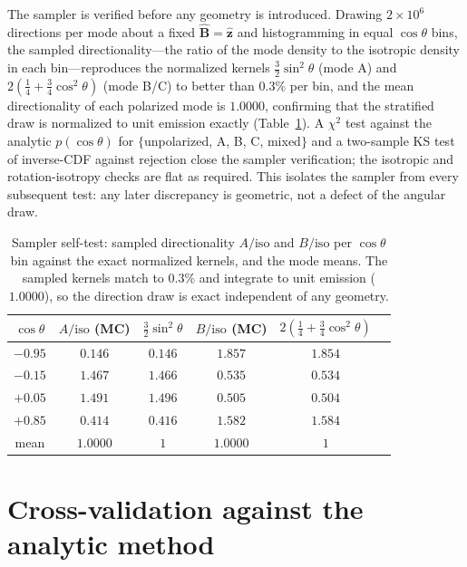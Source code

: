 \documentclass[11pt]{article}
\newcommand{\Bhat}{\hat{\bm{B}}}
\newcommand{\iso}{\mathrm{iso}}
\begin{document}
The sampler is verified before any geometry is introduced. Drawing $2\times10^6$
directions per mode about a fixed $\Bhat=\hat{\bm z}$ and histogramming in equal
$\cos\theta$ bins, the sampled directionality---the ratio of the mode density to the
isotropic density in each bin---reproduces the normalized kernels
$\tfrac32\sin^2\theta$ (mode A) and $2(\tfrac14+\tfrac34\cos^2\theta)$ (mode B/C) to
better than $0.3\%$ per bin, and the mean directionality of each polarized mode is
$1.0000$, confirming that the stratified draw is normalized to unit emission exactly
(Table~\ref{tab:sampler}). A $\chi^2$ test against the analytic $p(\cos\theta)$ for
$\{$unpolarized, A, B, C, mixed$\}$ and a two-sample KS test of inverse-CDF against
rejection close the sampler verification; the isotropic and rotation-isotropy checks are
flat as required. This isolates the sampler from every subsequent test: any later
discrepancy is geometric, not a defect of the angular draw.

\begin{table}[t]
\centering
\caption{Sampler self-test: sampled directionality $A/\iso$ and $B/\iso$ per
$\cos\theta$ bin against the exact normalized kernels, and the mode means. The sampled
kernels match to $0.3\%$ and integrate to unit emission ($1.0000$), so the direction draw
is exact independent of any geometry.}
\label{tab:sampler}
\begin{tabular}{cccccc}
\toprule
$\cos\theta$ & $A/\iso$ (MC) & $\tfrac32\sin^2\theta$ & $B/\iso$ (MC) & $2(\tfrac14+\tfrac34\cos^2\theta)$ \\
\midrule
$-0.95$ & $0.146$ & $0.146$ & $1.857$ & $1.854$ \\
$-0.15$ & $1.467$ & $1.466$ & $0.535$ & $0.534$ \\
$+0.05$ & $1.491$ & $1.496$ & $0.505$ & $0.504$ \\
$+0.85$ & $0.414$ & $0.416$ & $1.582$ & $1.584$ \\
\midrule
mean & $1.0000$ & $1$ & $1.0000$ & $1$ \\
\bottomrule
\end{tabular}
\end{table}

\section{Cross-validation against the analytic method}
\label{sec:validation}
\end{document}
